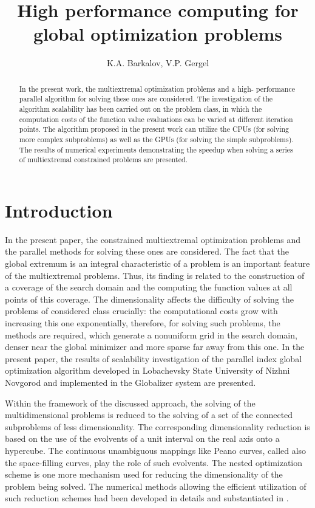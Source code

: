 \documentclass[a4paper]{jpconf}
\begin{document}
\title{High performance computing for global optimization problems}


\author{K.A. Barkalov, V.P. Gergel}

\address{Lobachevsky State University of Nizhni Novgorod, Gagarin avenue 23, 
Nizhnш Novgorod, Russia, 603950}



\begin{abstract}
In the present work, the multiextremal optimization problems and a high-
performance parallel algorithm for solving these ones are considered. The 
investigation of the algorithm scalability has been carried out on the 
problem class, in which the computation costs of the function value evaluations can be varied at different iteration points. The algorithm proposed in the present work can utilize 
the CPUs (for solving more complex subproblems) as well as the GPUs (for 
solving the simple subproblems). The results of numerical experiments 
demonstrating the speedup when solving a series of multiextremal constrained 
problems are presented.
\end{abstract}

\section{Introduction}
In the present paper, the constrained multiextremal optimization problems and 
the parallel methods for solving these ones are considered. The fact that the 
global extremum is an integral characteristic of a problem is an important 
feature of the multiextremal problems. Thus, its finding is related to the 
construction of a coverage of the search domain and the computing the 
 function values at all points of this coverage. The dimensionality 
affects the difficulty of solving the problems of considered class crucially: 
the computational costs grow with increasing this one exponentially, 
therefore, for solving such problems, the methods are required, which 
generate a nonuniform grid in the search domain, denser near the 
global minimizer and more sparse far away from this one. In the 
present paper, the results of scalability investigation of the parallel 
index global optimization algorithm developed in Lobachevsky State 
University of Nizhni Novgorod \cite{Strongin2000,Strongin2013} and implemented in the Globalizer 
system \cite{Globalizer,Globalizer1} are presented.

Within the framework of the discussed approach, the solving of the 
multidimensional problems is reduced to the solving of a set of the connected 
subproblems of less dimensionality. The corresponding dimensionality 
reduction is based on the use of the evolvents of a unit interval on the real 
axis onto a hypercube. The continuous unambiguous mappings like Peano curves, 
called also the space-filling curves, play the role of such evolvents. 
The nested optimization scheme is one more mechanism used for reducing the 
dimensionality of the problem being solved. The numerical methods allowing 
the efficient utilization of such reduction schemes had been developed 
in details and substantiated in \cite{Strongin2000,Strongin2013}.
\end{document}
